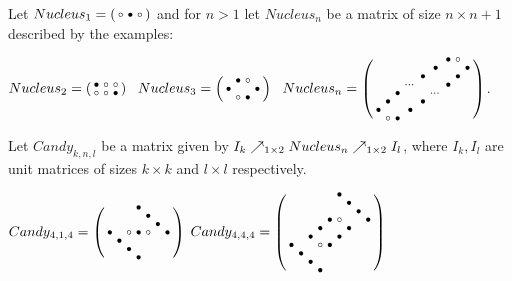 \begin{defn}
Let $Nucleus_1=\left(\begin{smallmatrix}\circ&\bullet&\circ\end{smallmatrix}\right)$ and for $n>1$ let $Nucleus_n$ be a matrix of size ${n\times n+1}$ described by the examples:
\begin{center}
$Nucleus_2=\smm{\bullet&\circ&\circ\\\circ&\circ&\bullet}\ \ 
Nucleus_3=\smm{ &\bullet&\circ& \\\bullet& & &\bullet\\ &\circ&\bullet& }\ \ 
Nucleus_n=\smm{ & & & & & &\bullet&\circ& \\ & & & & &\bullet& & &\bullet\\ & & & &\bullet& & &\bullet& \\ & & &\cdots& & &\bullet& & \\ & &\bullet& & &\cdots& & & \\ &\bullet& & &\bullet& & & & \\\bullet& & &\bullet& & & & & \\ &\circ&\bullet& & & & & & \\}$.
\end{center}
\end{defn}

\begin{defn}
Let $Candy_{k,n,l}$ be a matrix given by $I_k\nearrow_{1\times2}Nucleus_n\nearrow_{1\times2}I_l$, where $I_k,I_l$ are unit matrices of sizes $k\times k$ and $l\times l$ respectively.
\end{defn}
$Candy_{4,1,4}=\left(\begin{smallmatrix}
 & & &\bullet& & & \\
 & & & &\bullet& & \\
 & & & & &\bullet& \\
\bullet& &\circ&\bullet&\circ& &\bullet\\
 &\bullet& & & & & \\
 & &\bullet& & & & \\
 & & &\bullet& & & \end{smallmatrix}\right)$
$Candy_{4,4,4}=\left(\begin{smallmatrix}
 & & & & &\bullet& & & \\
 & & & & & &\bullet& & \\
 & & & & & & &\bullet& \\
 & & & & \bullet&\circ& & &\bullet\\
 & & &\bullet& & &\bullet& & \\
 & & \bullet& & &\bullet& & & \\
\bullet& & &\circ&\bullet& & & & \\
 &\bullet& & & & & & & \\
 & &\bullet& & & & & & \\
 & & &\bullet& & & & & \end{smallmatrix}\right)$

